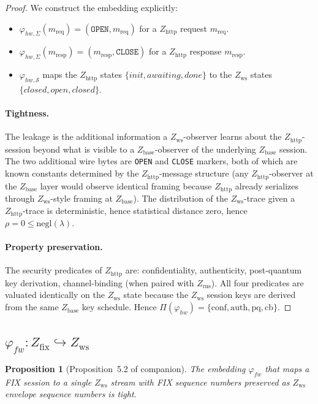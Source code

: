 \documentclass[11pt]{article}
\newtheorem{proposition}[theorem]{Proposition}
\theoremstyle{definition}
\theoremstyle{remark}
\newcommand{\Zb}{Z_{\mathrm{base}}}
\newcommand{\Zh}{Z_{\mathrm{http}}}
\newcommand{\Zw}{Z_{\mathrm{ws}}}
\newcommand{\Zf}{Z_{\mathrm{fix}}}
\newcommand{\Zr}{Z_{\mathrm{rns}}}
\begin{document}
\begin{proof}
We construct the embedding explicitly:
\begin{itemize}
\item $\varphi_{hw,\Sigma}(m_{\mathrm{req}}) = (\mathtt{OPEN},
m_{\mathrm{req}})$ for a $\Zh$ request $m_{\mathrm{req}}$.
\item $\varphi_{hw,\Sigma}(m_{\mathrm{resp}}) = (m_{\mathrm{resp}},
\mathtt{CLOSE})$ for a $\Zh$ response $m_{\mathrm{resp}}$.
\item $\varphi_{hw,\mathcal{S}}$ maps the $\Zh$ states
$\{\mathit{init}, \mathit{awaiting}, \mathit{done}\}$ to the
$\Zw$ states $\{\mathit{closed}, \mathit{open}, \mathit{closed}\}$.
\end{itemize}

\paragraph{Tightness.}
The leakage is the additional information a $\Zw$-observer learns
about the $\Zh$-session beyond what is visible to a $\Zb$-observer
of the underlying $\Zb$ session. The two additional wire bytes are
\texttt{OPEN} and \texttt{CLOSE} markers, both of which are known
constants determined by the $\Zh$-message structure (any
$\Zh$-observer at the $\Zb$ layer would observe identical framing
because $\Zh$ already serializes through $\Zw$-style framing at
$\Zb$). The distribution of the $\Zw$-trace given a $\Zh$-trace is
deterministic, hence statistical distance zero, hence $\rho = 0
\le \mathrm{negl}(\lambda)$.

\paragraph{Property preservation.}
The security predicates of $\Zh$ are: confidentiality, authenticity,
post-quantum key derivation, channel-binding (when paired with
$\Zr$). All four predicates are valuated identically on the $\Zw$
state because the $\Zw$ session keys are derived from the same $\Zb$
key schedule. Hence
$\Pi(\varphi_{hw}) = \{\mathrm{conf}, \mathrm{auth}, \mathrm{pq},
\mathrm{cb}\}$.
\end{proof}

\subsection{$\varphi_{fw} : \Zf \hookrightarrow \Zw$}

\begin{proposition}[Proposition~5.2 of companion]
\label{prop:fw-proof}
The embedding $\varphi_{fw}$ that maps a FIX session to a single
$\Zw$ stream with FIX sequence numbers preserved as $\Zw$ envelope
sequence numbers is tight.
\end{proposition}
\end{document}
